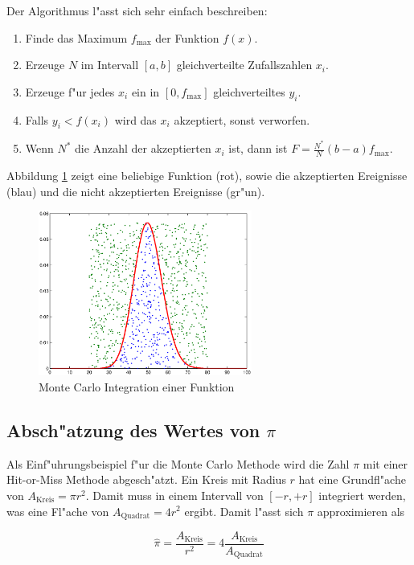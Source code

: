 \begin{refsection}
Der Algorithmus l"asst sich sehr einfach beschreiben:

\begin{enumerate}
\item Finde das Maximum $f_{\max}$ der Funktion $f(x)$.
\item Erzeuge $N$ im Intervall $[a,b]$ gleichverteilte Zufallszahlen $x_i$.
\item Erzeuge f"ur jedes $x_i$ ein in $[0,f_{\max}]$ gleichverteiltes $y_i$.
\item Falls $y_i < f(x_i)$ wird das $x_i$ akzeptiert, sonst verworfen.
\item Wenn $N^*$ die Anzahl der akzeptierten $x_i$ ist, dann ist $F =
\frac{N^*}{N}(b-a)f_{\max}$.
\end{enumerate}

Abbildung \ref{fig:integration_histogram} zeigt eine beliebige Funktion
(rot), sowie die akzeptierten Ereignisse (blau) und die nicht akzeptierten
Ereignisse (gr"un).

\begin{figure}[htbp]
	\centering
	\includegraphics[width=7cm]{montecarlo/images/integration_poisson.eps}
	\caption{Monte Carlo Integration einer Funktion}
	\label{fig:integration_histogram}
\end{figure}

\subsection{Absch"atzung des Wertes von $\pi$}
Als Einf"uhrungsbeispiel f"ur die Monte Carlo Methode wird die Zahl $\pi$
mit einer Hit-or-Miss Methode abgesch"atzt. Ein Kreis mit Radius $r$
hat eine Grundfl"ache von $A_{\text{Kreis}} = \pi r^{2}$.  Damit muss
in einem Intervall von $[-r,+r]$ integriert werden, was eine Fl"ache
von $A_{\text{Quadrat}} = 4r^2$ ergibt. Damit l"asst sich $\pi$
approximieren als

\begin{equation}
	\hat{\pi} = \frac{A_{\text{Kreis}}}{r^2} = 4 \frac{A_{\text{Kreis}}}{A_{\text{Quadrat}}}
\end{equation}


\end{refsection}
